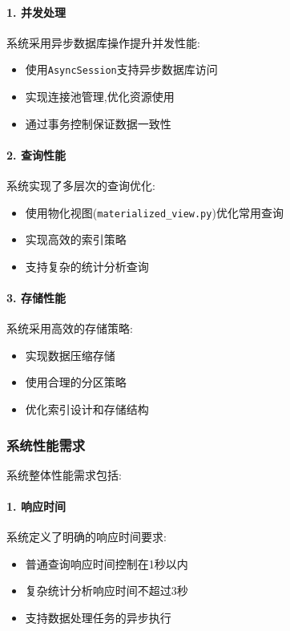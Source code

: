 \paragraph{1. 并发处理}
系统采用异步数据库操作提升并发性能:
\begin{itemize}
    \item 使用\texttt{AsyncSession}支持异步数据库访问
    \item 实现连接池管理,优化资源使用
    \item 通过事务控制保证数据一致性
\end{itemize}

\paragraph{2. 查询性能}
系统实现了多层次的查询优化:
\begin{itemize}
    \item 使用物化视图(\texttt{materialized\_view.py})优化常用查询
    \item 实现高效的索引策略
    \item 支持复杂的统计分析查询
\end{itemize}

\paragraph{3. 存储性能}
系统采用高效的存储策略:
\begin{itemize}
    \item 实现数据压缩存储
    \item 使用合理的分区策略
    \item 优化索引设计和存储结构
\end{itemize}

\subsubsection{系统性能需求}

系统整体性能需求包括:

\paragraph{1. 响应时间}
系统定义了明确的响应时间要求:
\begin{itemize}
    \item 普通查询响应时间控制在1秒以内
    \item 复杂统计分析响应时间不超过3秒
    \item 支持数据处理任务的异步执行
\end{itemize}

